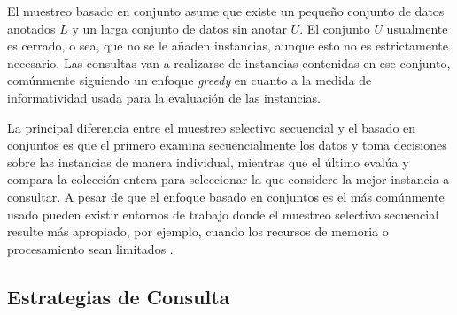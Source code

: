 El muestreo basado en conjunto \cite{lewis1994sequential} asume que existe un pequeño conjunto de datos anotados $L$ y un larga conjunto de datos sin anotar $U$.  El conjunto $U$ usualmente es cerrado, o sea, que no se le añaden instancias, aunque esto no es estrictamente necesario. Las consultas van a realizarse de instancias contenidas en ese conjunto, comúnmente siguiendo un enfoque \textit{greedy} en cuanto a la medida de informatividad usada para la evaluación de las instancias. 


La principal diferencia entre el muestreo selectivo secuencial y el basado en conjuntos es que el primero examina secuencialmente los datos y toma decisiones sobre las instancias de manera individual, mientras que el último evalúa y compara la colección entera para seleccionar la que considere la mejor instancia a consultar. A pesar de que el enfoque basado en conjuntos es el más comúnmente usado pueden existir entornos de trabajo donde el muestreo selectivo secuencial resulte más apropiado, por ejemplo, cuando los recursos de memoria o procesamiento sean limitados \cite{settles2009survey}.

%



\subsection{Estrategias de Consulta}


